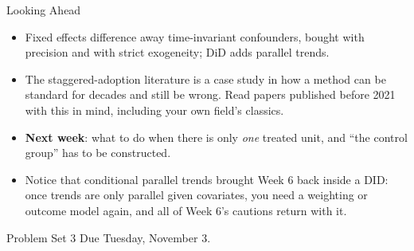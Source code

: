 \documentclass[aspectratio=169,11pt,xcolor=dvipsnames]{beamer}
\begin{document}
\begin{frame}{Looking Ahead}
\begin{itemize}\itemsep4pt
  \item Fixed effects difference away time-invariant confounders, bought with
        precision and with strict exogeneity; DiD adds parallel trends.
  \item The staggered-adoption literature is a case study in how a method can be
        standard for decades and still be wrong. Read papers published before
        2021 with this in mind, including your own field's classics.
  \item \textbf{Next week}: what to do when there is only \emph{one} treated
        unit, and ``the control group'' has to be constructed.
  \item Notice that conditional parallel trends brought Week 6 back inside a
        DID: once trends are only parallel given covariates, you need a weighting
        or outcome model again, and all of Week 6's cautions return with it.
\end{itemize}
\vskip4pt
\begin{block}{Problem Set 3}
Due Tuesday, November 3.
\end{block}
\end{frame}
\end{document}
